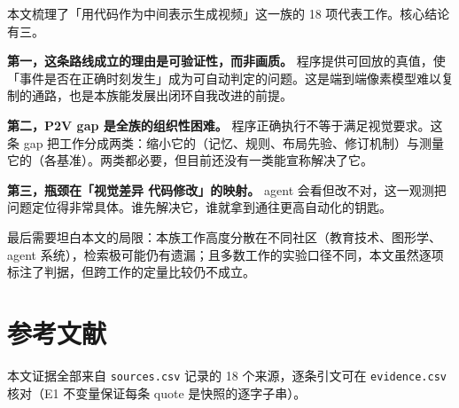 本文梳理了「用代码作为中间表示生成视频」这一族的 18 项代表工作。核心结论有三。


\textbf{第一，这条路线成立的理由是可验证性，而非画质。} 程序提供可回放的真值，使「事件是否在正确时刻发生」成为可自动判定的问题。这是端到端像素模型难以复制的通路，也是本族能发展出闭环自我改进的前提。


\textbf{第二，P2V gap 是全族的组织性困难。} 程序正确执行不等于满足视觉要求。这条 gap 把工作分成两类：缩小它的（记忆、规则、布局先验、修订机制）与测量它的（各基准）。两类都必要，但目前还没有一类能宣称解决了它。


\textbf{第三，瓶颈在「视觉差异  代码修改」的映射。} agent 会看但改不对，这一观测把问题定位得非常具体。谁先解决它，谁就拿到通往更高自动化的钥匙。


最后需要坦白本文的局限：本族工作高度分散在不同社区（教育技术、图形学、agent 系统），检索极可能仍有遗漏；且多数工作的实验口径不同，本文虽然逐项标注了判据，但跨工作的定量比较仍不成立。



\section{参考文献}

本文证据全部来自 \texttt{sources.csv} 记录的 18 个来源，逐条引文可在 \texttt{evidence.csv} 核对（E1 不变量保证每条 quote 是快照的逐字子串）。


